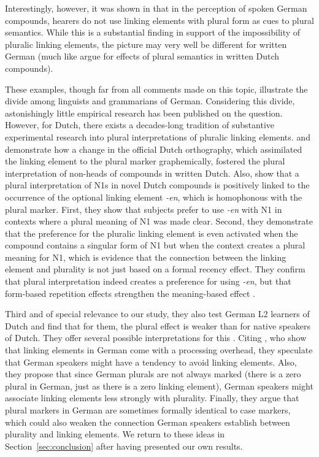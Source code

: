 Interestingly, however, it was shown in \textcite{KoesterEa2004} that in the perception of spoken German compounds, hearers do not use linking elements with plural form as cues to plural semantics.
While this is a substantial finding in support of the impossibility of pluralic linking elements, the picture may very well be different for written German (much like \citealt{SchreuderEa1998} argue for effects of plural semantics in written Dutch compounds).

These examples, though far from all comments made on this topic, illustrate the divide among linguists and grammarians of German.
Considering this divide, astonishingly little empirical research has been published on the question.
However, for Dutch, there exists a decades-long tradition of substantive experimental research into plural interpretations of pluralic linking elements.
\textcite{SchreuderEa1998} and \textcite{BangaEa2012} demonstrate how a change in the official Dutch orthography, which assimilated the linking element to the plural marker graphemically, fostered the plural interpretation of non-heads of compounds in written Dutch.
Also, \textcite{BangaEa2013a} show that a plural interpretation of N1s in novel Dutch compounds is positively linked to the occurrence of the optional linking element \textit{-en}, which is homophonous with the plural marker.
First, they show that subjects prefer to use \textit{-en} with N1 in contexts where a plural meaning of N1 was made clear.
Second, they demonstrate that the preference for the pluralic linking element is even activated when the compound contains a singular form of N1 but when the context creates a plural meaning for N1, which is evidence that the connection between the linking element and plurality is not just based on a formal recency effect.
They confirm that plural interpretation indeed creates a preference for using \textit{-en}, but that form-based repetition effects strengthen the meaning-based effect \parencite[45]{BangaEa2013a}.

Third and of special relevance to our study, they also test German L2 learners of Dutch and find that for them, the plural effect is weaker than for native speakers of Dutch.
They offer several possible interpretations for this \parencite[45--47]{BangaEa2013a}.
Citing \textcite{LibbenEa2002}, who show that linking elements in German come with a processing overhead, they speculate that German speakers might have a tendency to avoid linking elements.
Also, they propose that since German plurals are not always marked (there is a zero plural in German, just as there is a zero linking element), German speakers might associate linking elements less strongly with plurality.
Finally, they argue that plural markers in German are sometimes formally identical to case markers, which could also weaken the connection German speakers establish between plurality and linking elements.
We return to these ideas in Section~\ref{sec:conclusion} after having presented our own results.

